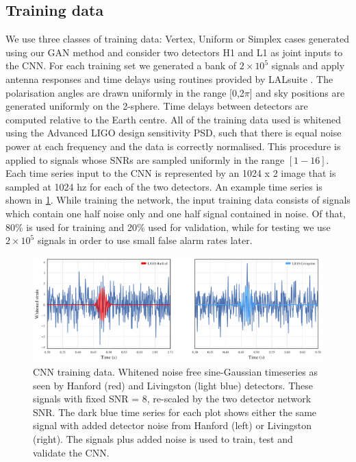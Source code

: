 \documentclass[12pt]{iopart}
\begin{document}
\subsection{Training data} 
We use three classes of training data: Vertex, Uniform or Simplex cases generated using our \ac{GAN} method and consider two detectors H1 and L1 as joint inputs to the \ac{CNN}. For each training set we generated a bank of $2\times 10^5$ signals and apply antenna responses and time delays using routines provided by LALsuite \cite{lalsuite}. The polarisation angles are drawn uniformly in the range [0,2$\pi$] and sky positions are generated uniformly on the 2-sphere. Time delays between detectors are computed relative to the Earth centre. All of the training data used is whitened using the Advanced LIGO
design sensitivity \ac{PSD}, such that there is equal noise power at each
frequency and the data is correctly normalised. This procedure is
applied to signals whose \acp{SNR} are sampled uniformly in the range $[1-16]$. Each time series input to the \ac{CNN} is represented by an 1024 x 2 image that is sampled at 1024 hz for each of the two detectors. An example time series is shown in \cref{fig:cnn_training}. While training the network, the input training data consists of
signals which contain one half noise only and one half signal contained in
noise. Of that, 80\% is used for training and 20\% used for validation, while for testing we use $2\times 10^5$ signals in order to use small false alarm rates later.

\begin{figure}[ht!]
    \centering
    \includegraphics[width=\textwidth]{figures/SNR8.png}
    \caption{\ac{CNN} training data. Whitened noise free sine-Gaussian timeseries as seen by Hanford (red) and Livingston (light blue) detectors. These signals with fixed SNR = 8, re-scaled by the two detector network SNR. The dark blue time series for each plot shows either the same signal with added detector noise from Hanford (left) or Livingston (right). The signals plus added noise is used to train, test and validate the \ac{CNN}.}
     \label{fig:cnn_training}
\end{figure}
\end{document}
